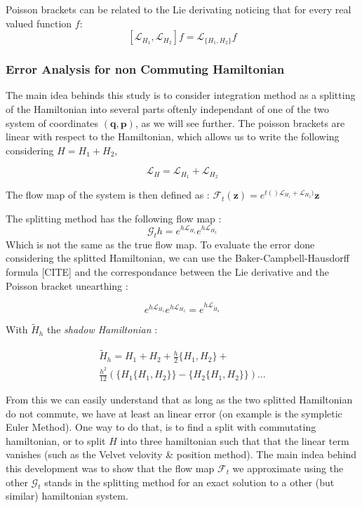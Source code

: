 \documentclass[ansiapaper]{report}
\begin{document}
\begin{multicols}{3}
  Poisson brackets can be related to the Lie derivating noticing that for every real valued function $f$: $$[\mathcal{L}_{H_1}, \mathcal{L}_{H_2}]f = \mathcal{L}_{\{H_1, H_2\}}f$$

  \subsubsection{Error Analysis for non Commuting Hamiltonian}
  The main idea behinds this study is to consider integration method as a splitting of the Hamiltonian into several parts oftenly independant of one of the two system of coordinates $(\textbf{q}, \textbf{p})$, as we will see further. The poisson brackets are linear with respect to the Hamiltonian, which allows us to write the following considering $H = H_1 + H_2$,

  $$\mathcal{L}_H = \mathcal{L}_{H_1} + \mathcal{L}_{H_2}$$

  The flow map of the system is then defined as : $\mathcal{F}_t(\textbf{z}) = e^{t()\mathcal{L}_{H_1} + \mathcal{L}_{H_2})}\textbf{z}  $

  The splitting method has the following flow map : $$\mathcal{G}_th= e^{h\mathcal{L}_{H_1}}e^{h\mathcal{L}_{H_2}}$$ Which is not the same as the true flow map. To evaluate the error done considering the splitted Hamiltonian, we can use the Baker-Campbell-Hausdorff formula [CITE] and the correspondance between the Lie derivative and the Poisson bracket unearthing :

  $$ e^{h\mathcal{L}_{H_1}}e^{h\mathcal{L}_{H_2}} = e^{ h \mathcal{L}_{\tilde{H}_h}}$$

  With $\tilde{H}_h$ the \textit{shadow Hamiltonian} :

  \begin{multline*}
    \tilde{H}_h = H_1 + H_2 + \frac{h}{2}\{H_1 , H_2 \} + \\
    \frac{h^2}{12}(\{H_1 \{H_1 , H_2\} \} - \{H_2 \{H_1 , H_2 \} \}) \dots
  \end{multline*}


  From this we can easily understand that as long as the two splitted Hamiltonian do not commute, we have at least an linear error (on example is the sympletic Euler Method). One way to do that, is to find a split with commutating hamiltonian, or to split $H$ into three hamiltonian such that that the linear term vanishes (such as the Velvet velovity \& position method). The main indea behind this  development was to show that the flow map $\mathcal{F}_t$ we approximate using the other $\mathcal{G}_t$ stands in the splitting method for an exact solution to a other (but similar) hamiltonian system.


\end{multicols}
\end{document}
